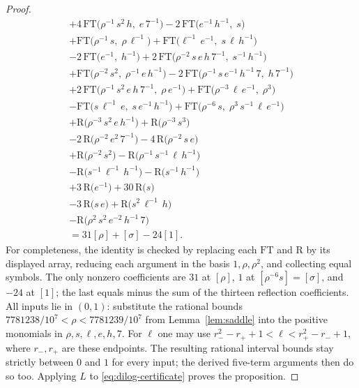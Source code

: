\documentclass[11pt,reqno]{amsart}
\theoremstyle{remark}
\numberwithin{equation}{section}
\begin{document}
\begin{proof}
\begin{multline}
+ 4\,\mathrm{FT}\big(\rho^{-1}\,s^{2}\,h,\;e\,7^{-1}\big) - 2\,\mathrm{FT}\big(e^{-1}\,h^{-1},\;s\big)\\
+ \mathrm{FT}\big(\rho^{-1}\,s,\;\rho\,\ell^{-1}\big) + \mathrm{FT}\big(\ell^{-1}\,e^{-1},\;s\,\ell\,h^{-1}\big)\\
- 2\,\mathrm{FT}\big(e^{-1},\;h^{-1}\big) + 2\,\mathrm{FT}\big(\rho^{-2}\,s\,e\,h\,7^{-1},\;s^{-1}\,h^{-1}\big)\\
+ \mathrm{FT}\big(\rho^{-2}\,s^{2},\;\rho^{-1}\,e\,h^{-1}\big) - 2\,\mathrm{FT}\big(\rho^{-1}\,s\,e^{-1}\,h^{-1}\,7,\;h\,7^{-1}\big)\\
+ 2\,\mathrm{FT}\big(\rho^{-1}\,s^{2}\,e\,h\,7^{-1},\;\rho\,e^{-1}\big) + \mathrm{FT}\big(\rho^{-3}\,\ell\,e^{-1},\;\rho^{3}\big)\\
- \mathrm{FT}\big(s\,\ell^{-1}\,e,\;s\,e^{-1}\,h^{-1}\big) + \mathrm{FT}\big(\rho^{-6}\,s,\;\rho^{3}\,s^{-1}\,\ell\,e^{-1}\big)\\
+ \mathrm{R}\big(\rho^{-3}\,s^{2}\,e\,h^{-1}\big) + \mathrm{R}\big(\rho^{-3}\,s^{3}\big)\\
- 2\,\mathrm{R}\big(\rho^{-2}\,e^{2}\,7^{-1}\big) - 4\,\mathrm{R}\big(\rho^{-2}\,s\,e\big)\\
+ \mathrm{R}\big(\rho^{-2}\,s^{2}\big) - \mathrm{R}\big(\rho^{-1}\,s^{-1}\,\ell\,h^{-1}\big)\\
- \mathrm{R}\big(s^{-1}\,\ell^{-1}\,h^{-1}\big) - \mathrm{R}\big(s^{-1}\,h^{-1}\big)\\
+ 3\,\mathrm{R}\big(e^{-1}\big) + 30\,\mathrm{R}\big(s\big)\\
- 3\,\mathrm{R}\big(s\,e\big) + \mathrm{R}\big(s^{2}\,\ell^{-1}\,h\big)\\
- \mathrm{R}\big(\rho^{2}\,s^{2}\,e^{-2}\,h^{-1}\,7\big)\\
=31[\rho]+[\sigma]-24[1].
\end{multline}
\endgroup
For completeness, the identity is checked by replacing each
$\mathrm{FT}$ and $\mathrm R$ by its displayed array, reducing each
argument in the basis $1,\rho,\rho^2$, and collecting equal symbols.
The only nonzero coefficients are $31$ at $[\rho]$, $1$ at
$[\rho^{-6}s]=[\sigma]$, and $-24$ at $[1]$; the last equals
minus the sum of the thirteen reflection coefficients.
All inputs lie in $(0,1)$: substitute the rational bounds
$7781238/10^7<\rho<7781239/10^7$ from Lemma~\ref{lem:saddle}
into the positive monomials in $\rho,s,\ell,e,h,7$.
For $\ell$ one may use
$r_-^2-r_++1<\ell<r_+^2-r_-+1$, where $r_-,r_+$ are these endpoints.
The resulting rational interval bounds stay strictly between $0$ and
$1$ for every input; the derived five-term arguments then do so too.
Applying $L$ to \eqref{eq:dilog-certificate} proves the proposition.
\end{proof}
\end{document}
